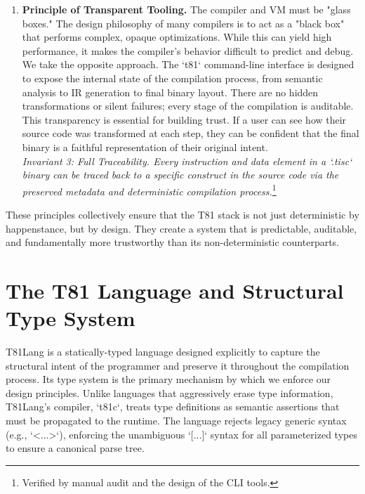 \documentclass[sigconf, 10pt]{acmart}
\begin{document}
\begin{enumerate}
\textit{Invariant 2: End-to-End Canonicalization. Given a valid T81Lang source file and supported toolchain matrix, `t81 compile` is expected to produce a bit-identical `.tisc` file.}\footnote{Enforced operationally via reproducibility gates and cross-arch checks described in Section 8.2.}
\item \textbf{Principle of Transparent Tooling.} The compiler and VM must be "glass boxes." The design philosophy of many compilers is to act as a "black box" that performs complex, opaque optimizations. While this can yield high performance, it makes the compiler's behavior difficult to predict and debug. We take the opposite approach. The `t81` command-line interface is designed to expose the internal state of the compilation process, from semantic analysis to IR generation to final binary layout. There are no hidden transformations or silent failures; every stage of the compilation is auditable. This transparency is essential for building trust. If a user can see how their source code was transformed at each step, they can be confident that the final binary is a faithful representation of their original intent. \\
\textit{Invariant 3: Full Traceability. Every instruction and data element in a `.tisc` binary can be traced back to a specific construct in the source code via the preserved metadata and deterministic compilation process.}\footnote{Verified by manual audit and the design of the CLI tools.}
\end{enumerate}
These principles collectively ensure that the T81 stack is not just deterministic by happenstance, but by design. They create a system that is predictable, auditable, and fundamentally more trustworthy than its non-deterministic counterparts.
\section{The T81 Language and Structural Type System}
T81Lang is a statically-typed language designed explicitly to capture the structural intent of the programmer and preserve it throughout the compilation process. Its type system is the primary mechanism by which we enforce our design principles. Unlike languages that aggressively erase type information, T81Lang's compiler, `t81c`, treats type definitions as semantic assertions that must be propagated to the runtime. The language rejects legacy generic syntax (e.g., `<...>`), enforcing the unambiguous `[...]` syntax for all parameterized types to ensure a canonical parse tree.
\end{document}
